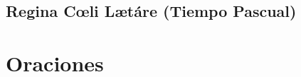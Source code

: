 \documentclass[10pt,oneside]{book}
\begin{document}
\section*{Regina C{\oe}li L{\ae}táre (Tiempo Pascual)}

\begin{paracol}{2}  
      
      
      \switchcolumn
      
                                                                      
\end{paracol}
\chapter*{Oraciones}

\begin{paracol}{2}  
      \\

      \\

      \\

      \\

      \\

      
      
      \switchcolumn
      
      \\

      \\

      \\

      \\

      \\

                                                                          
\end{paracol}
\end{document}
